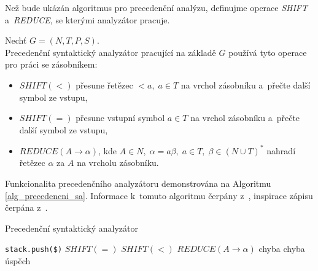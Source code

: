 Než bude ukázán algoritmus pro precedenční analýzu, definujme operace \emph{SHIFT} a~\emph{REDUCE}, se kterými analyzátor pracuje.
\begin{definition}
    Nechť $G = (N, T, P, S)$.\\
    Precedenční syntaktický analyzátor pracující na základě $G$ používá tyto operace pro práci se zásobníkem:
    \begin{itemize}
        \item $SHIFT(<)$ přesune řetězec $<a,\; a \in T$ na vrchol zásobníku a~přečte další symbol ze vstupu,
        \item $SHIFT(=)$ přesune vstupní symbol $a \in T$ na vrchol zásobníku a~přečte další symbol ze vstupu,
        \item $REDUCE(A \rightarrow \alpha)$, kde $A \in N,\; \alpha = a\beta,\; a \in T,\; \beta \in (N \cup T)^*$ nahradí řetězec $\alpha$ za $A$ na vrcholu zásobníku.
    \end{itemize}
\end{definition}
Funkcionalita precedenčního analyzátoru demonstrována na Algoritmu \ref{alg_precedencni_sa}.
Informace k~tomuto algoritmu čerpány z~\cite{medunaElementsOfCompDesign,meduna2017sa-zdola-nahoru}, inspirace zápisu čerpána z~\cite{kunda2022}.
\begin{algorithm}[h]
    \caption{Precedenční syntaktický analyzátor}
    \label{alg_precedencni_sa}
    \begin{algorithmic}[1]
        \NewLine
        \State \texttt{stack.push(\$)}
        \Repeat
                \Case{$=$}
                    \State $SHIFT(=)$
                \EndCase
                \Case{$<$}
                    \State $SHIFT(<)$
                \EndCase
                \Case{$>$}
                        \State $REDUCE(A \rightarrow \alpha)$
                    \Else
                        \State chyba 
                    \EndIf
                \EndCase
                \Case{$\times$}
                    \State chyba 
                \EndCase
                \Case{\checkmark}
                    \State úspěch
                \EndCase
            \EndSwitch
    \end{algorithmic}
\end{algorithm}

